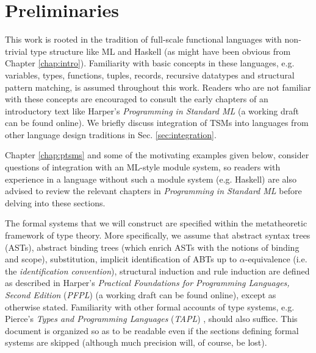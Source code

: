 
\section{Preliminaries}\label{sec:preliminaries}
This work is rooted in the tradition of full-scale functional languages with non-trivial type structure like ML and Haskell (as might have been obvious from Chapter \ref{chap:intro}). Familiarity with basic concepts in these languages, e.g. variables, types, functions, tuples, records,  recursive datatypes and structural pattern matching, is assumed throughout this work. Readers who are not familiar with these concepts are encouraged to consult the early chapters of an introductory text like Harper's \emph{Programming in Standard ML} \cite{harper1997programming} (a working draft can be found online). We briefly discuss integration of TSMs into languages from other language design traditions in Sec. \ref{sec:integration}.

Chapter \ref{chap:ptsms} and some of the motivating examples given below, consider questions of integration with an ML-style module system, so readers with experience in a language without such a module system (e.g. Haskell) are also advised to review the relevant chapters in \emph{Programming in Standard ML} \cite{harper1997programming} before delving into these sections.

The formal systems that we will construct are specified within the metatheoretic framework of type theory. More specifically, we assume that abstract syntax trees (ASTs), abstract binding trees (which enrich ASTs with the notions of binding and scope), substitution, implicit identification of ABTs up to $\alpha$-equivalence (i.e. the \emph{identification convention}), structural induction and rule induction are defined as described in Harper's \emph{Practical Foundations for Programming Languages, Second Edition} (\emph{PFPL}) \cite{pfpl} (a working draft can be found online), except as otherwise stated. Familiarity with other formal accounts of type systems, e.g. Pierce's \emph{Types and Programming Languages} (\emph{TAPL}) \cite{tapl}, should also suffice. This document is organized so as to be readable even if the sections defining formal systems are skipped (although much precision will, of course, be lost).

